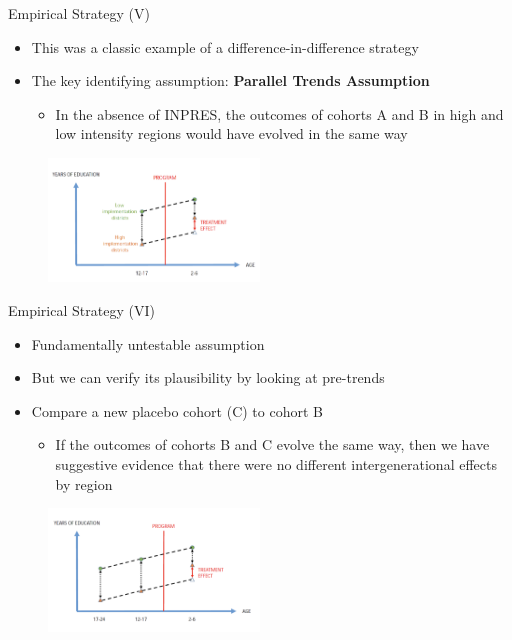 \documentclass[11pt,notes=hide,aspectratio=169,mathserif]{beamer}
\begin{document}
\begin{frame}{Empirical Strategy (V)}
\begin{itemize}
     \item This was a classic example of a difference-in-difference strategy
     \item  The key identifying assumption: \textbf{Parallel Trends Assumption}
     \begin{itemize}
        \item   In the absence of INPRES, the outcomes of cohorts A and B in high and low intensity regions would have evolved in the same way
    \end{itemize}
\end{itemize}
 \begin{figure}
    \centering
    \includegraphics[width=0.5\textwidth]{inputs/diagram1.png}
\end{figure}
\end{frame}

\begin{frame}{Empirical Strategy (VI)}
\begin{itemize}
     \item Fundamentally untestable assumption
     \item  But we can verify its plausibility by looking at pre-trends 
     \item Compare a new placebo cohort (C) to cohort B
     \begin{itemize}
        \item  If the outcomes of cohorts B and C evolve the same way, then we have suggestive evidence that there were no different intergenerational effects by region 
    \end{itemize}
\end{itemize}
{
\begin{figure}
    \centering
    \includegraphics[width=0.5\textwidth]{inputs/diagram2.png}
\end{figure}
}
\end{frame}
\end{document}
